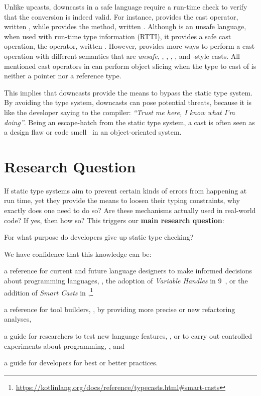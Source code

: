 Unlike upcasts,
downcasts in a safe language require a run-time check to verify that the conversion is indeed valid.
For instance, \java{} provides the cast operator, written ,
while \scala{} provides the  method,
written .
Although \cpp{} is an unsafe language,
when used with run-time type information (RTTI),
it provides a safe cast operation, the  operator,
written .
However,
\cpp{} provides more ways to perform a cast operation with different semantics that are \emph{unsafe}, \ie{},
,
,
, and
\cc{}-style casts.
All mentioned cast operators in \cpp{} can perform object slicing when the type to cast of is neither a pointer nor a reference type.

This implies that downcasts provide the means to bypass the static type system.
By avoiding the type system, downcasts can pose potential threats, because it is like the developer saying to the compiler: \emph{``Trust me here, I know what I'm doing''}.
Being an escape-hatch from the static type system,
a cast is often seen as a design flaw or code smell~\citep{tufanoWhenWhyYour2015} in an object-oriented system.


\section{Research Question}

If static type systems aim to prevent certain kinds of errors from happening at run time,
yet they provide the means to loosen their typing constraints,
why exactly does one need to do so?
Are these mechanisms actually used in real-world code?
If yes, then how so?
This triggers our \textbf{main research question}:

\begin{mdframed}

\centering
For what purpose do developers give up static type checking?
\end{mdframed}

We have confidence that this knowledge can be:
\begin{inparaenum}[a)]
\item a reference for current and future language designers
to make informed decisions about programming languages,
\eg{}, the adoption of \emph{Variable Handles} in \java{} 9~\citep{jep193},
or the addition of \emph{Smart Casts} in ,\footnote{\url{https://kotlinlang.org/docs/reference/typecasts.html\#smart-casts}}
\item a reference for tool builders, \eg{}, by providing more precise or new refactoring analyses,
\item a guide for researchers to test new language features, \eg{}, \cite{wintherGuardedTypePromotion2011} or to carry out controlled experiments about programming, \eg{}, \cite{stuchlikStaticVsDynamic2011} and
\item a guide for developers for best or better practices.
\end{inparaenum}

